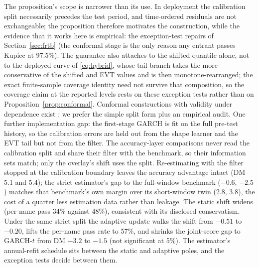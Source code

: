 \documentclass[11pt]{article}
\theoremstyle{remark}
\begin{document}
The proposition's scope is narrower than its use. In
deployment the calibration split necessarily precedes the test period,
and time-ordered residuals are not exchangeable; the proposition
therefore motivates the construction, while the evidence that it works here is empirical: the exception-test repairs of
Section~\ref{sec:frtb} (the conformal stage is the only reason any
entrant passes Kupiec at 97.5\%). The guarantee also attaches to the
shifted quantile alone, not to the deployed curve of \eqref{eq:hybrid},
whose tail branch takes the more conservative of the shifted and EVT
values and is then monotone-rearranged; the exact finite-sample coverage
identity need not survive that composition, so the coverage claim at the
reported levels rests on these exception tests rather than on
Proposition~\ref{prop:conformal}. Conformal constructions with
validity under dependence exist \citep{chernozhukov2018conformal}; we
prefer the simple split form plus an empirical audit. One further
implementation gap: the first-stage
GARCH is fit on the full pre-test history, so the calibration errors
are held out from the shape learner and the EVT tail but not from the
filter. The accuracy-layer comparisons never read the calibration split
and share their filter with the benchmark, so their information sets
match; only the overlay's shift uses the split. Re-estimating with the
filter stopped at the calibration boundary leaves the accuracy advantage
intact (DM 5.1 and 5.4); the strict estimator's gap to the full-window
benchmark ($-0.6$, $-2.5$) matches that benchmark's own margin over its
short-window twin (2.8, 3.8), the cost of a quarter less estimation data
rather than leakage. The static shift widens (per-name pass 34\% against
48\%), consistent with its disclosed conservatism. Under the same strict
split the adaptive update \citep{gibbs2021aci} walks the shift from
$-0.51$ to $-0.20$, lifts the per-name pass rate to 57\%, and shrinks the
joint-score gap to GARCH-$t$ from DM $-3.2$ to $-1.5$ (not significant at
5\%). The estimator's annual-refit
schedule sits between the static and adaptive poles, and the exception
tests decide between them.
\end{document}
